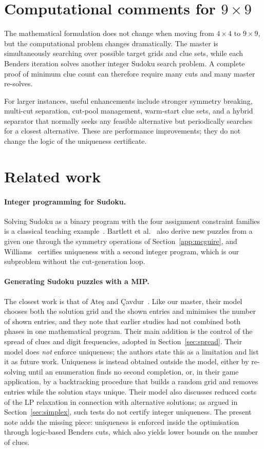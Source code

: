 \documentclass[11pt]{article}
\begin{document}
\section{Computational comments for $9\times9$}

The mathematical formulation does not change when moving from $4\times4$ to $9\times9$, but the computational problem changes dramatically. The master is simultaneously searching over possible target grids and clue sets, while each Benders iteration solves another integer Sudoku search problem. A complete proof of minimum clue count can therefore require many cuts and many master re-solves.

For larger instances, useful enhancements include stronger symmetry breaking, multi-cut separation, cut-pool management, warm-start clue sets, and a hybrid separator that normally seeks any feasible alternative but periodically searches for a closest alternative. These are performance improvements; they do not change the logic of the uniqueness certificate.

\section{Related work}

\paragraph{Integer programming for Sudoku.} Solving Sudoku as a binary program with the four assignment constraint families is a classical teaching example~\cite{chlond,koch,bartlett}. Bartlett et al.~\cite{bartlett} also derive new puzzles from a given one through the symmetry operations of Section~\ref{app:mcguire}, and Williams~\cite{williams} certifies uniqueness with a second integer program, which is our subproblem without the cut-generation loop.

\paragraph{Generating Sudoku puzzles with a MIP.} The closest work is that of Ate\c{s} and \c{C}avdur~\cite{ates}. Like our master, their model chooses both the solution grid and the shown entries and minimises the number of shown entries, and they note that earlier studies had not combined both phases in one mathematical program. Their main addition is the control of the spread of clues and digit frequencies, adopted in Section~\ref{sec:spread}. Their model does \emph{not} enforce uniqueness; the authors state this as a limitation and list it as future work. Uniqueness is instead obtained outside the model, either by re-solving until an enumeration finds no second completion, or, in their game application, by a backtracking procedure that builds a random grid and removes entries while the solution stays unique. Their model also discusses reduced costs of the LP relaxation in connection with alternative solutions; as argued in Section~\ref{sec:simplex}, such tests do not certify integer uniqueness. The present note adds the missing piece: uniqueness is enforced inside the optimisation through logic-based Benders cuts, which also yields lower bounds on the number of clues.
\end{document}
